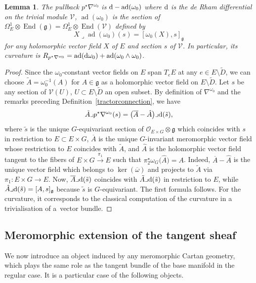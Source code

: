\documentclass[pdftex]{sigma}
\numberwithin{equation}{section}
\newtheorem{Lemma}[Theorem]{Lemma}
\begin{document}
\begin{Lemma}\label{curvaturetractor} The pullback $p^\star \nabla^{\omega_0}$ is ${\rm d} - \operatorname{ad}(\omega_0)$ where ${\rm d}$ is the de Rham differential on the trivial module $\mathcal{V}$, $\operatorname{ad}(\omega_0)$ is the section of $\Omega^1_E \otimes \operatorname{End}(\mathfrak{g}) = \Omega^1_E \otimes \operatorname{End}(\mathcal{V})$ defined by
\[X\lrcorner \operatorname{ad}(\omega_0)(s)= [\omega_0(X),s]_\mathfrak{g}\] for any holomorphic vector field $X$ of $E$ and section $s$ of $\mathcal{V}$. In particular, its curvature is $R_{p^\star \nabla^{\omega_0}} = \operatorname{ad}({\rm d}\omega_0) + \operatorname{ad}(\omega_0\wedge \omega_0)$. \end{Lemma}
\begin{proof}Since the $\omega_0$-constant vector fields on $E$ span $T_eE$ at any $e\in E\setminus \tilde{D}$, we can choose $\tilde{A}=\omega_0^{-1}(A)$ for $A\in \mathfrak{g}$ as a holomorphic vector field on $E\setminus \tilde{D}$. Let $s$ be any section of $\mathcal{V}(U)$, $U\subset E\setminus \tilde{D}$ an open subset. By definition of $\nabla^{\omega_0}$ and the remarks preceding Definition~\ref{tractorconnection}, we have
\[\tilde{A}\lrcorner p^\star \nabla^{\omega_0}(s) =\big(\overline{A}-\hat{A}\big)\lrcorner {\rm d}(\tilde{s}),\]
where $\tilde{s}$ is the unique $G$-equivariant section of $\mathcal{O}_{E\times G}\otimes \mathfrak{g}$ which coincides with $s$ in restriction to $E\subset E\times G$, $\overline{A}$ is the unique $G$-invariant meromorphic vector field whose restriction to $E$ coincides with $\tilde{A}$, and $\hat{A}$ is the holomorphic vector field tangent to the fibers of $E\times G \overset{\pi_1}{\longrightarrow} E$ such that $\pi_2^\star \omega_G\big(\hat{A}\big)=A$. Indeed, $\overline{A}-\hat{A}$ is the unique vector field which belongs to $\ker(\overline{\omega})$ and projects to $\tilde{A}$ via $\pi_1\colon E\times G\longrightarrow E$. Now, $\overline{A} \lrcorner {\rm d}(\tilde{s})$ coincides with $\tilde{A}\lrcorner {\rm d}(\tilde{s})$ in restriction to $E$, while $\hat{A}\lrcorner {\rm d}(\tilde{s}) = [A,s]_\mathfrak{g}$ because $\tilde{s}$ is $G$-equivariant. The first formula follows. For the curvature, it corresponds to the classical computation of the curvature in a trivialisation of a~vector bundle.
\end{proof}

\subsection{Meromorphic extension of the tangent sheaf}
We now introduce an object induced by any meromorphic Cartan geometry, which plays the same role as the tangent bundle of the base manifold in the regular case. It is a particular case of the following objects.
\end{document}
